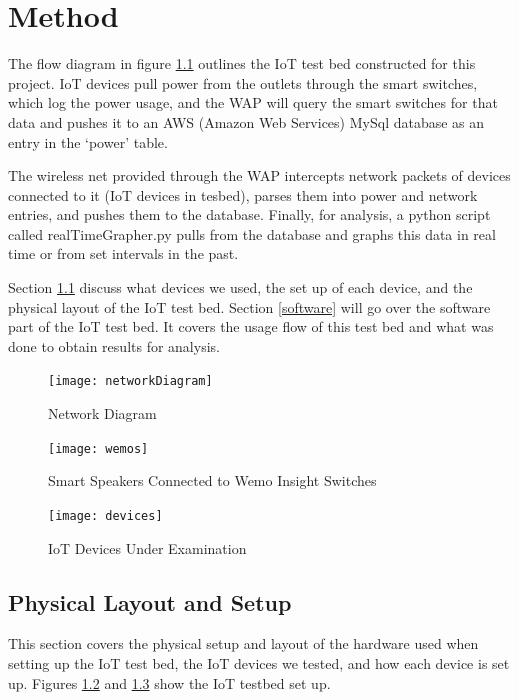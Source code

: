 \chapter{Method}
\label{Method}
The flow diagram in figure \ref{fig:network} outlines the IoT test bed constructed for this project. IoT devices pull power from the outlets through the smart switches, which log the power usage, and the WAP will query the smart switches for that data and pushes it to an AWS (Amazon Web Services)\cite{rds} MySql\cite{mysql} database as an entry in the `power' table.

The wireless net provided through the WAP intercepts network packets of devices connected to it (IoT devices in tesbed), parses them into power and network entries, and pushes them to the database. Finally, for analysis, a python script called realTimeGrapher.py pulls from the database and graphs this data in real time or from set intervals in the past.

Section \ref{Physical Layout and Setup} discuss what devices we used, the set up of each device, and the physical layout of the IoT test bed. Section \ref{software} will go over the software part of the IoT test bed. It covers the usage flow of this test bed and what was done to obtain results for analysis.

\begin{figure}[H]
    \centering
    \texttt{[image: networkDiagram]}
    \caption{Network Diagram}
    \label{fig:network}
\end{figure}

\begin{figure}[H]
    \centering
    \texttt{[image: wemos]}
    \caption{Smart Speakers Connected to Wemo Insight Switches}
    \label{fig:wemo}
\end{figure}

\begin{figure}[H]
    \centering
    \texttt{[image: devices]}
    \caption{IoT Devices Under Examination}
    \label{fig:devices}
\end{figure}

\section{Physical Layout and Setup}
\label{Physical Layout and Setup}

This section covers the physical setup and layout of the hardware used when setting up the IoT test bed, the IoT devices we tested, and how each device is set up. Figures \ref{fig:wemo} and \ref{fig:devices} show the IoT testbed set up.

